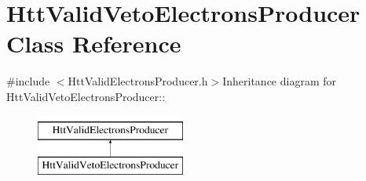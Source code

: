 \hypertarget{classHttValidVetoElectronsProducer}{
\section{HttValidVetoElectronsProducer Class Reference}
\label{classHttValidVetoElectronsProducer}
}


{\ttfamily \#include $<$HttValidElectronsProducer.h$>$}Inheritance diagram for HttValidVetoElectronsProducer::\begin{figure}[H]
\begin{center}
\leavevmode
\includegraphics[height=2cm]{classHttValidVetoElectronsProducer}
\end{center}
\end{figure}
